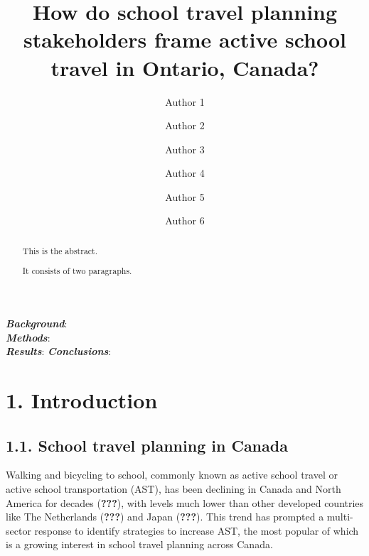 \documentclass[]{elsarticle} %
\begin{document}
\begin{frontmatter}

  \title{How do school travel planning stakeholders frame active school travel in
Ontario, Canada?}
    \author[Some Department]{Author 1}
    \author[Some Department]{Author 2}
    \author[Another University]{Author 3}
    \author[Some Institute]{Author 4}
    \author[Some University]{Author 5}
    \author[Some Department]{Author 6}
      \address[Some Department]{Department, Street, City, Province, Postal Code}
    \address[Another University]{Department, Street, City, Province, Postal Code}
    \address[Some Institute]{Street, City, Province, Postal Code}
    \address[Some University]{Department, Street, City, Province, Postal Code}
  
  \begin{abstract}
  This is the abstract.
  
  It consists of two paragraphs.
  \end{abstract}
  
 \end{frontmatter}

\textbf{\emph{Background}}:\\
\textbf{\emph{Methods}}:\\
\textbf{\emph{Results}}: \textbf{\emph{Conclusions}}:

\newpage

\hypertarget{introduction}{%
\section{1. Introduction}\label{introduction}}

\hypertarget{school-travel-planning-in-canada}{%
\subsection{1.1. School travel planning in
Canada}\label{school-travel-planning-in-canada}}

Walking and bicycling to school, commonly known as active school travel
or active school transportation (AST), has been declining in Canada and
North America for decades ({\textbf{???}}), with levels much lower than
other developed countries like The Netherlands ({\textbf{???}}) and
Japan ({\textbf{???}}). This trend has prompted a multi-sector response
to identify strategies to increase AST, the most popular of which is a
growing interest in school travel planning across Canada.
\end{document}
